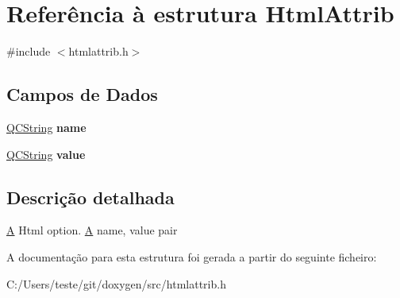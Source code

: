 \hypertarget{struct_html_attrib}{\section{Referência à estrutura Html\-Attrib}
\label{struct_html_attrib}
}


{\ttfamily \#include $<$htmlattrib.\-h$>$}

\subsection*{Campos de Dados}
\begin{DoxyCompactItemize}
\item 
\hypertarget{struct_html_attrib_adc0097c7bd1e61ad32058fcde425bc7a}{\hyperlink{class_q_c_string}{Q\-C\-String} {\bfseries name}}\label{struct_html_attrib_adc0097c7bd1e61ad32058fcde425bc7a}

\item 
\hypertarget{struct_html_attrib_a8cf8ea05f44c555fbad45f6c04e3bb11}{\hyperlink{class_q_c_string}{Q\-C\-String} {\bfseries value}}\label{struct_html_attrib_a8cf8ea05f44c555fbad45f6c04e3bb11}

\end{DoxyCompactItemize}


\subsection{Descrição detalhada}
\hyperlink{class_a}{A} Html option. \hyperlink{class_a}{A} name, value pair 

A documentação para esta estrutura foi gerada a partir do seguinte ficheiro\-:\begin{DoxyCompactItemize}
\item 
C\-:/\-Users/teste/git/doxygen/src/htmlattrib.\-h\end{DoxyCompactItemize}
